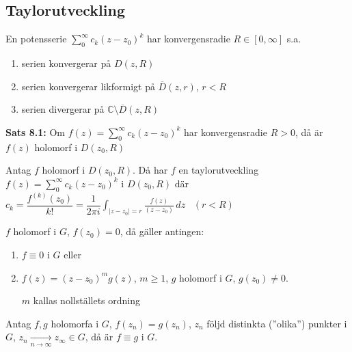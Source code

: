 \subsection{Taylorutveckling}
\begin{theorem}[Sats 7.31]
En potensserie $\sum_0^\infty c_k(z - z_0)^k$ har konvergensradie $R \in [0, \infty]$ s.a.
\begin{enumerate}[label=\textcircled{\alph*}]
  \item serien konvergerar på $D(z, R)$
  \item serien konvergerar likformigt på $\overline{D}(z, r)$, $r < R$
  \item serien divergerar på $\mathbb{C} \setminus \overline{D}(z, R)$
\end{enumerate}
\end{theorem}

\textbf{Sats 8.1:} Om $f(z) = \sum_0^\infty c_k(z - z_0)^k$ har konvergensradie $R > 0$, då är $f(z)$ holomorf i $D(z_0, R)$

\begin{theorem}
Antag $f$ holomorf i $D(z_0, R)$. Då har $f$ en taylorutveckling $f(z) = \sum_0^\infty c_k(z - z_0)^k$ i $D(z_0, R)$ där $c_k = \dfrac{f^{(k)}(z_0)}{k!} = \dfrac{1}{2\pi i} \displaystyle\int_{|z - z_0| = r} \frac{f(z)}{(z - z_0)}\,dz$ \ $(r < R)$
\end{theorem}

\begin{theorem}
$f$ holomorf i $G$, $f(z_0) = 0$, då gäller antingen:
\begin{enumerate}[label=\textcolor{red!70!black}{\roman*)}]
  \item $f \equiv 0$ i $G$ eller
  \item $f(z) = (z - z_0)^m g(z)$, $m \ge 1$, $g$ holomorf i $G$, $g(z_0) \neq 0$.

  $m$ kallas nollställets ordning
\end{enumerate}
\end{theorem}

\begin{theorem}
Antag $f, g$ holomorfa i $G$, $f(z_n) = g(z_n)$, $z_n$ följd distinkta \textcolor{magenta!80!black}{(''olika'')} punkter i $G$, $z_n \xrightarrow[n \to \infty]{} z_\infty \in G$, då är $f \equiv g$ i $G$.
\end{theorem}
